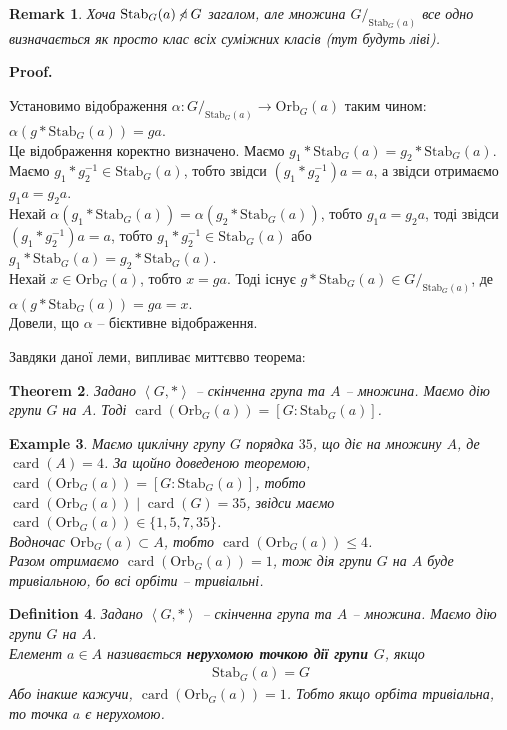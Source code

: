 \documentclass[a4paper, 10pt]{article}
\makeatletter
\theoremstyle{theoremdd}
\newtheorem{theorem}{Theorem}[subsection]
\theoremstyle{theoremdd}
\newtheorem{definition}[theorem]{Definition}
\theoremstyle{theoremdd}
\theoremstyle{theoremdd}
\theoremstyle{theoremdd}
\newtheorem{example}[theorem]{Example}
\theoremstyle{theoremdd}
\theoremstyle{theoremdd}
\theoremstyle{theoremdd}
\theoremstyle{theoremdd}
\theoremstyle{theoremdd}
\theoremstyle{theoremdd}
\newtheorem{remark}[theorem]{Remark}
\theoremstyle{theoremdd}
\theoremstyle{theoremdd}
\theoremstyle{theoremdd}
\theoremstyle{theoremdd}
\renewenvironment{proof}[1][Proof.\\]{\par
\pushQED{\hfill \qed}%
\normalfont \topsep6\p@\@plus6\p@\relax
\trivlist
\item\relax
{\bfseries
#1\@addpunct{.}}\hspace\labelsep\ignorespaces
}{%
\popQED\endtrivlist\@endpefalse
}
\DeclareMathOperator{\card}{card}
\newcommand\Orb{\text{Orb}}
\newcommand\Stab{\text{Stab}}
\makeatother
\begin{document}
\begin{remark}
Хоча $\Stab_G(a) \centernot\triangleleft G$ загалом, але множина $G/_{\Stab_G(a)}$ все одно визначається як просто клас всіх суміжних класів (тут будуть ліві).
\end{remark}

\begin{proof}
Установимо відображення $\alpha \colon G/_{\Stab_G(a)} \to \Orb_G(a)$ таким чином: $\alpha(g*\Stab_G(a)) = ga$.\\
Це відображення коректно визначено. Маємо $g_1*\Stab_G(a) = g_2*\Stab_G(a)$. Маємо $g_1*g_2^{-1} \in \Stab_G(a)$, тобто звідси $(g_1*g_2^{-1})a = a$, а звідси отримаємо $g_1a = g_2a$.\\
Нехай $\alpha(g_1*\Stab_G(a)) = \alpha(g_2*\Stab_G(a))$, тобто $g_1a = g_2a$, тоді звідси $(g_1*g_2^{-1})a = a$, тобто $g_1*g_2^{-1} \in \Stab_G(a)$ або $g_1*\Stab_G(a) = g_2*\Stab_G(a)$.\\
Нехай $x \in \Orb_G(a)$, тобто $x = ga$. Тоді існує $g*\Stab_G(a) \in G/_{\Stab_G(a)}$, де $\alpha(g*\Stab_G(a)) = ga = x$.\\
Довели, що $\alpha$ -- бієктивне відображення.
\end{proof}

Завдяки даної леми, випливає миттєвво теорема:

\begin{theorem}
Задано $\left<G,*\right>$ -- скінченна група та $A$ -- множина. Маємо дію групи $G$ на $A$. Тоді $\card(\Orb_G(a)) = [G:\Stab_G(a)]$.
\end{theorem}

\begin{example}
Маємо циклічну групу $G$ порядка $35$, що діє на множину $A$, де $\card(A) = 4$. За щойно доведеною теоремою, $\card(\Orb_G(a)) = [G : \Stab_G(a)]$, тобто $\card(\Orb_G(a)) \mid \card(G) = 35$, звідси маємо $\card(\Orb_G(a)) \in \{1,5,7,35\}$.\\
Водночас $\Orb_G(a) \subset A$, тобто $\card(\Orb_G(a)) \leq 4$.\\
Разом отримаємо $\card(\Orb_G(a)) = 1$, тож дія групи $G$ на $A$ буде тривіальною, бо всі орбіти -- тривіальні. 
\end{example}

\begin{definition}
Задано $\left<G,*\right>$ -- скінченна група та $A$ -- множина. Маємо дію групи $G$ на $A$.\\
Елемент $a \in A$ називається \textbf{нерухомою точкою дії групи $G$}, якщо
\begin{align*}
\Stab_G(a) = G
\end{align*}
Або інакше кажучи, $\card(\Orb_G(a)) = 1$. Тобто якщо орбіта тривіальна, то точка $a$ є нерухомою.
\end{definition}
\end{document}
